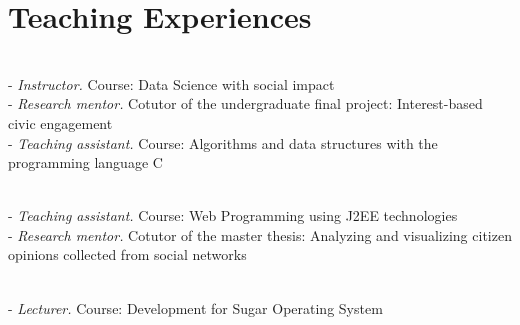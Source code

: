 
\section{Teaching Experiences}

 \\
- \textit{Instructor.} Course: Data Science with social impact\\
- \textit{Research mentor.} Cotutor of the undergraduate final project: Interest-based civic engagement\\
- \textit{Teaching assistant.} Course: Algorithms and data structures with the programming language C

 \\
- \textit{Teaching assistant.} Course: Web Programming using J2EE technologies\\
- \textit{Research mentor.} Cotutor of the master thesis: Analyzing and visualizing citizen opinions collected from social networks

 \\
- \textit{Lecturer.} Course: Development for Sugar Operating System







